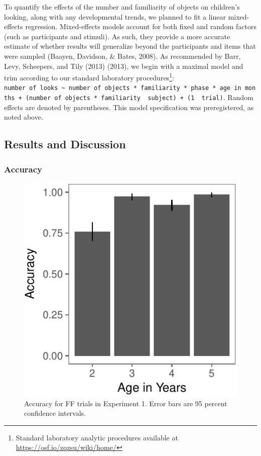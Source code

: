 \documentclass[english,man]{apa6}
\theoremstyle{definition}
\theoremstyle{definition}
\theoremstyle{definition}
\theoremstyle{remark}
\begin{document}
To quantify the effects of the number and familiarity of objects on
children's looking, along with any developmental trends, we planned to
fit a linear mixed-effects regression. Mixed-effects models account for
both fixed and random factors (such as participants and stimuli). As
such, they provide a more accurate estimate of whether results will
generalize beyond the participants and items that were sampled (Baayen,
Davidson, \& Bates, 2008). As recommended by Barr, Levy, Scheepers, and
Tily (2013) (2013), we begin with a maximal model and trim according to
our standard laboratory procedures\footnote{Standard laboratory analytic
  procedures available at \url{https://osf.io/zqzsu/wiki/home/}}:
\texttt{number\ of\ looks\ \textasciitilde{}\ number\ of\ objects\ *\ familiarity\ *\ phase\ *\ age\ in\ months\ +\ (number\ of\ objects\ *\ familiarity\ \textbar{}\ subject)\ +\ (1\ \textbar{}\ trial)}.
Random effects are denoted by parentheses. This model specification was
preregistered, as noted above.

\subsection{Results and Discussion}\label{results-and-discussion}

\subsubsection{Accuracy}\label{accuracy}

\begin{figure}
\centering
\includegraphics{figs/acce1-1.pdf}
\caption{\label{fig:acce1}Accuracy for FF trials in Experiment 1. Error bars
are 95 percent confidence intervals.}
\end{figure}
\end{document}
